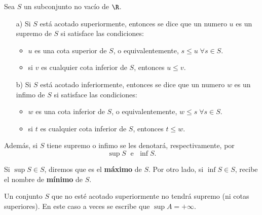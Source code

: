 \begin{definition}
	Sea \(S \) un subconjunto no vacío de \(\R \).
	\begin{enumerate}
		\item[a)] Si \(S \) está acotado superiormente, entonces se dice que un numero \(u \) es un supremo de \(S \) si satisface las condiciones:
			\begin{itemize}
				\item \(u \) es una cota superior de \(S \), o equivalentemente, \(s \leq u \;\forall s \in S \).
				\item si \(v \) es cualquier cota inferior de \(S \), entonces \(u \leq v \).
			\end{itemize}
		\item[b)] Si \(S \) está acotado inferiormente, entonces se dice que un numero \(w \) es un infimo de \(S\) si satisface las condiciones: \begin{itemize}
				\item \(w \) es una cota inferior de \(S \), o equivalentemente, \(w \leq s \; \forall s \in S \).
				\item si \(t \) es cualquier cota inferior de \(S \), entonces \(t \leq w \).
			\end{itemize}
	\end{enumerate}

	Además, si \(S \) tiene supremo o infimo se les denotará, respectivamente, por
	\[
		\sup S \;\text{ e } \;\inf S .
	\]
\end{definition}
Si \(\sup S \in S\), diremos que es el \textbf{máximo}  de \(S \). Por otro lado, si \(\inf S \in S \), recibe el nombre de \textbf{mínimo}  de \(S \).

Un conjunto \(S \) que no esté acotado superiormente no tendrá supremo (ni cotas superiores). En este caso a veces se escribe que \(\sup A = + \infty \).
